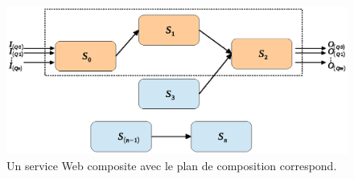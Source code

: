 \begin{figure}[h]
    \centering
    \includegraphics[width=1\textwidth]{figs/ch3/composition-plan.eps}
    \caption{Un service Web composite avec le plan de composition correspond.}
    \label{fig:ch3/composition-plan}
\end{figure}
